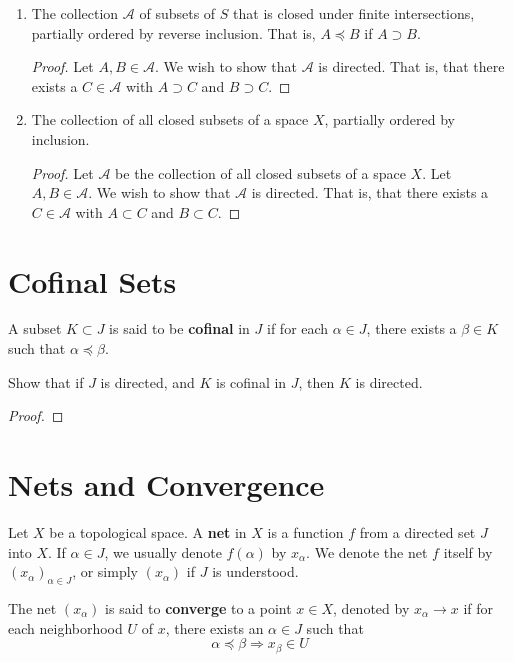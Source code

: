 \documentclass[12pt]{article}
\begin{document}
\begin{enumerate}
	\item The collection $\mathcal A$ of subsets of $S$ that is closed under finite intersections,
	      partially ordered by reverse inclusion. That is, $A \preceq B$ if $A \supset B$.
	      \begin{proof}
		      Let $A, B \in \mathcal A$. We wish to show that $\mathcal A$ is directed. That is, that
		      there exists a $C \in \mathcal A$ with $A \supset C$ and $B \supset C$.
	      \end{proof}

	\item The collection of all closed subsets of a space $X$, partially ordered by inclusion.
	      \begin{proof}
		      Let $\mathcal A$ be the collection of all closed subsets of a space $X$. Let $A, B \in
			      \mathcal A$. We wish to show that $\mathcal A$ is directed. That is, that there exists a $C \in
			      \mathcal A$ with $A \subset C$ and $B \subset C$.
	      \end{proof}
\end{enumerate}

\section{Cofinal Sets}
\begin{defn}
	A subset $K \subset J$ is said to be \textbf{cofinal} in $J$ if for each $\alpha \in J$, there
	exists a $\beta \in K$ such that $\alpha \preceq \beta$.
\end{defn}

Show that if $J$ is directed, and $K$ is cofinal in $J$, then $K$ is directed.

\begin{proof}
\end{proof}

\section{Nets and Convergence}
\begin{defn}
	Let $X$ be a topological space. A \textbf{net} in $X$ is a function $f$ from a directed set $J$
	into $X$. If $\alpha \in J$, we usually denote $f(\alpha)$ by $x_\alpha$. We denote the net $f$
	itself by ${\left(x_\alpha\right)}_{\alpha \in J}$, or simply $(x_\alpha)$ if $J$ is understood.
\end{defn}
\begin{defn}
	The net $(x_\alpha)$ is said to \textbf{converge} to a point $x \in X$, denoted by $x_\alpha
		\to x$ if for each neighborhood $U$ of $x$, there exists an $\alpha \in J$ such that
	\[\alpha \preceq \beta \Longrightarrow x_\beta \in U\]
\end{defn}
\end{document}
